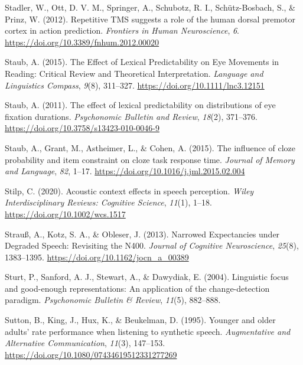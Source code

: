 \documentclass[a4paper, nobind]{templates/ociamthesis}
\newlength{\cslhangindent}
\newenvironment{CSLReferences}[2] %
 {%
  \setlength{\parindent}{0pt}
  \ifodd #1
  \let\oldpar\par
  \def\par{\hangindent=\cslhangindent\oldpar}
  \fi
  \setlength{\parskip}{1mm}
  \setlength{\baselineskip}{6mm}
 }%
 {}
\begin{document}
\begin{CSLReferences}{1}{0}
\leavevmode{}%
Stadler, W., Ott, D. V. M., Springer, A., Schubotz, R. I., Schütz-Bosbach, S., \& Prinz, W. (2012). Repetitive TMS suggests a role of the human dorsal premotor cortex in action prediction. \emph{Frontiers in Human Neuroscience}, \emph{6}. \url{https://doi.org/10.3389/fnhum.2012.00020}

\leavevmode{}%
Staub, A. (2015). The Effect of Lexical Predictability on Eye Movements in Reading: Critical Review and Theoretical Interpretation. \emph{Language and Linguistics Compass}, \emph{9}(8), 311--327. \url{https://doi.org/10.1111/lnc3.12151}

\leavevmode{}%
Staub, A. (2011). {The effect of lexical predictability on distributions of eye fixation durations}. \emph{Psychonomic Bulletin and Review}, \emph{18}(2), 371--376. \url{https://doi.org/10.3758/s13423-010-0046-9}

\leavevmode{}%
Staub, A., Grant, M., Astheimer, L., \& Cohen, A. (2015). {The influence of cloze probability and item constraint on cloze task response time}. \emph{Journal of Memory and Language}, \emph{82}, 1--17. \url{https://doi.org/10.1016/j.jml.2015.02.004}

\leavevmode{}%
Stilp, C. (2020). {Acoustic context effects in speech perception}. \emph{Wiley Interdisciplinary Reviews: Cognitive Science}, \emph{11}(1), 1--18. \url{https://doi.org/10.1002/wcs.1517}

\leavevmode{}%
Strauß, A., Kotz, S. A., \& Obleser, J. (2013). Narrowed Expectancies under Degraded Speech: Revisiting the N400. \emph{Journal of Cognitive Neuroscience}, \emph{25}(8), 1383--1395. \url{https://doi.org/10.1162/jocn_a_00389}

\leavevmode{}%
Sturt, P., Sanford, A. J., Stewart, A., \& Dawydiak, E. (2004). Linguistic focus and good-enough representations: An application of the change-detection paradigm. \emph{Psychonomic Bulletin \& Review}, \emph{11}(5), 882--888.

\leavevmode{}%
Sutton, B., King, J., Hux, K., \& Beukelman, D. (1995). Younger and older adults' rate performance when listening to synthetic speech. \emph{Augmentative and Alternative Communication}, \emph{11}(3), 147--153. \url{https://doi.org/10.1080/07434619512331277269}


\end{CSLReferences}
\end{document}
